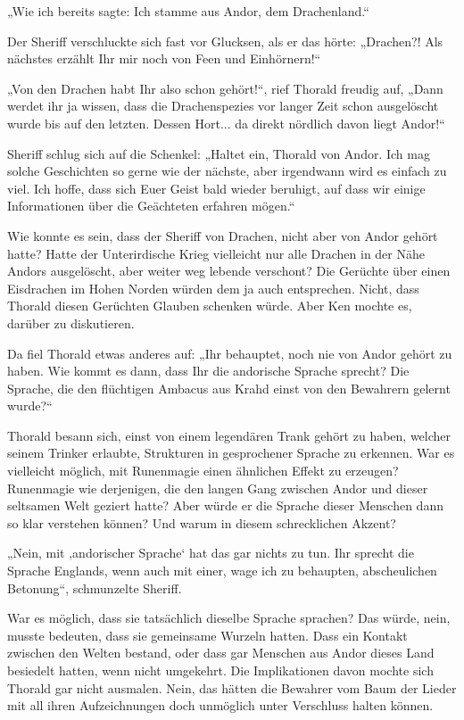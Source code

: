 „Wie ich bereits sagte: Ich stamme aus Andor, dem Drachenland.“

Der Sheriff verschluckte sich fast vor Glucksen, als er das hörte: „Drachen?! Als nächstes erzählt Ihr mir noch von Feen und Einhörnern!“

„Von den Drachen habt Ihr also schon gehört!“, rief Thorald freudig auf, „Dann werdet ihr ja wissen, dass die Drachenspezies vor langer Zeit schon ausgelöscht wurde bis auf den letzten. Dessen Hort... da direkt nördlich davon liegt Andor!“

Sheriff schlug sich auf die Schenkel: „Haltet ein, Thorald von Andor. Ich mag solche Geschichten so gerne wie der nächste, aber irgendwann wird es einfach zu viel. Ich hoffe, dass sich Euer Geist bald wieder beruhigt, auf dass wir einige Informationen über die Geächteten erfahren mögen.“

Wie konnte es sein, dass der Sheriff von Drachen, nicht aber von Andor gehört hatte? Hatte der Unterirdische Krieg vielleicht nur alle Drachen in der Nähe Andors ausgelöscht, aber weiter weg lebende verschont? Die Gerüchte über einen Eisdrachen im Hohen Norden würden dem ja auch entsprechen. Nicht, dass Thorald diesen Gerüchten Glauben schenken würde. Aber Ken mochte es, darüber zu diskutieren.

Da fiel Thorald etwas anderes auf: „Ihr behauptet, noch nie von Andor gehört zu haben. Wie kommt es dann, dass Ihr die andorische Sprache sprecht? Die Sprache, die den flüchtigen Ambacus aus Krahd einst von den Bewahrern gelernt wurde?“

Thorald besann sich, einst von einem legendären Trank gehört zu haben, welcher seinem Trinker erlaubte, Strukturen in gesprochener Sprache zu erkennen. War es vielleicht möglich, mit Runenmagie einen ähnlichen Effekt zu erzeugen? Runenmagie wie derjenigen, die den langen Gang zwischen Andor und dieser seltsamen Welt geziert hatte? Aber würde er die Sprache dieser Menschen dann so klar verstehen können? Und warum in diesem schrecklichen Akzent?

„Nein, mit ‚andorischer Sprache‘ hat das gar nichts zu tun. Ihr sprecht die Sprache Englands, wenn auch mit einer, wage ich zu behaupten, abscheulichen Betonung“, schmunzelte Sheriff.

War es möglich, dass sie tatsächlich dieselbe Sprache sprachen? Das würde, nein, musste bedeuten, dass sie gemeinsame Wurzeln hatten. Dass ein Kontakt zwischen den Welten bestand, oder dass gar Menschen aus Andor dieses Land besiedelt hatten, wenn nicht umgekehrt. Die Implikationen davon mochte sich Thorald gar nicht ausmalen. Nein, das hätten die Bewahrer vom Baum der Lieder mit all ihren Aufzeichnungen doch unmöglich unter Verschluss halten können.

